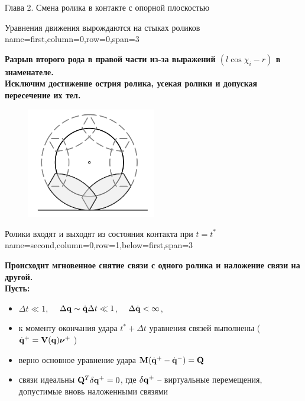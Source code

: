 \begin{myposter}{
    Глава 2. Смена ролика в контакте с опорной плоскостью
}

    \headerbox
    {Уравнения движения вырождаются на стыках роликов}
    {name=first,column=0,row=0,span=3}
    {
        {\huge\bf
            \vspace{10pt}
            Разрыв второго рода в правой части из-за выражений $(l\cos\chi_i-r)$ в знаменателе.\\
            Исключим достижение острия ролика, усекая ролики и допуская пересечение их тел.
            \begin{figure}[H]
                \centering
                \includegraphics[width=0.5\textwidth]{content/pic/asypng/pic_overlap.png}
            \end{figure}
            \vspace{10pt}
        }
    }
    
    \headerbox
    {Ролики входят и выходят из состояния контакта при $t = t^*$}
    {name=second,column=0,row=1,below=first,span=3}
    {
        {\huge\bf
            \vspace{10pt}
            Происходит мгновенное снятие связи с одного ролика и наложение связи на другой.\\
            Пусть:
            \begin{itemize}
                \item $\Delta t \ll 1$, $\quad \Delta \mathbf{q} \sim \dot{\mathbf{q}}\Delta t \ll 1$, $\quad \Delta \dot{\mathbf{q}} < \infty$,
                \item к моменту окончания удара $t^*+\Delta t$ уравнения связей выполнены (\enspace $\dot{\mathbf{q}}^+ = \mathbf{V}(\mathbf{q})\boldsymbol{\mathbf{\nu}}^+ \ $)
                \item верно основное уравнение удара \enspace $\mathbf{M} (\dot{\mathbf{q}}^+ - \dot{\mathbf{q}}^-) = \mathbf{Q}$
                \item связи идеальны \enspace $\mathbf{Q}^T\delta\mathbf{q}^+ = 0$, где $\delta\mathbf{q}^+$ -- виртуальные перемещения, допустимые вновь наложенными связями
            \end{itemize}
            \vspace{10pt}
        }
    }

\end{myposter}
